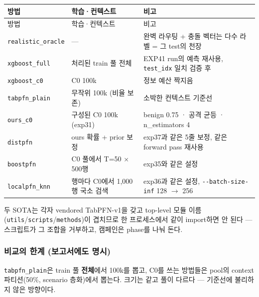 \begingroup
\footnotesize
\begin{longtable}{>{\raggedright\arraybackslash}p{}>{\raggedright\arraybackslash}p{}>{\raggedright\arraybackslash}p{}}
\toprule
방법 & 학습·컨텍스트 & 비고 \\ \midrule
\endfirsthead
방법 & 학습·컨텍스트 & 비고 \\ \midrule
\endhead
{}\texttt{realisti\allowbreak{}c\_\allowbreak{}\allowbreak{}oracle\allowbreak{}} & — & 완벽 라우팅 +\allowbreak{} 충돌 벡터는 다수 라벨 =\allowbreak{} 그 test의 천장 \\
{}\texttt{xgboost\_\allowbreak{}\allowbreak{}full} & 처리된 train 풀 전체 & EXP41 run의 예측 재사용, \texttt{test\_\allowbreak{}\allowbreak{}idx\allowbreak{}} 일치 검증 후 \\
{}\texttt{xgboost\_\allowbreak{}\allowbreak{}c0} & C0 100k & 정보 예산 짝지음 \\
{}\texttt{tabpfn\_\allowbreak{}\allowbreak{}p\allowbreak{}lain} & 무작위 100k (비율 보존) & 소박한 컨텍스트 기준선 \\
{}\texttt{ours\_\allowbreak{}\allowbreak{}c0} & 구성된 C0 100k (exp31) & benign 0.75 · 공격 균등 · n\_\allowbreak{}estimators 4 \\
{}\texttt{distpfn} & ours 확률 +\allowbreak{} prior 보정 & exp37과 같은 5줄 보정, 같은 forward pass 재사용 \\
{}\texttt{boostpfn\allowbreak{}} & C0 풀에서 T=\allowbreak{}50 × 500행 & exp35와 같은 설정 \\
{}\texttt{localpfn\allowbreak{}\_\allowbreak{}\allowbreak{}knn} & 행마다 C0에서 1,000행 국소 검색 & exp36과 같은 설정, \texttt{-\allowbreak{}-\allowbreak{}batch-\allowbreak{}size-\allowbreak{}inf\allowbreak{}} 128  \ensuremath{\rightarrow}  256 \\
\bottomrule
\end{longtable}
\endgroup
두 SOTA는 각자 vendored TabPFN-v1을 갖고 top-level 모듈 이름(\texttt{utils}/\allowbreak{}\texttt{scripts}/\allowbreak{}\texttt{methods})이 겹치므로 한 프로세스에서 같이 import하면 안 된다 — 스크립트가 그 조합을 거부하고, 캠페인은 phase를 나눠 돈다.

\subsubsection{비교의 한계 (보고서에도 명시)}
\par\noindent \textbullet\enspace \texttt{tabpfn\_\allowbreak{}\allowbreak{}p\allowbreak{}lain}은 train 풀 \textbf{전체}에서 100k를 뽑고, C0를 쓰는 방법들은 pool의 context 파티션(50\%, scenario 층화)에서 뽑는다. 크기는 같고 풀이 다르다 — 기준선에 불리하지 않은 방향이다.


